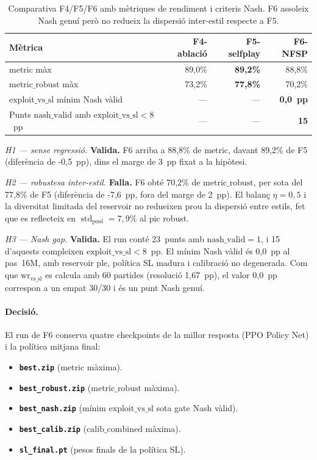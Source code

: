 \begin{table}[H]
  \centering
  \begin{tabular}{lrrr}
    \toprule
    Mètrica & F4-ablació & F5-selfplay & F6-NFSP \\
    \midrule
    \(\text{metric}\) màx & 89{,}0\% & \textbf{89{,}2\%} & 88{,}8\% \\
    \(\text{metric\_robust}\) màx & 73{,}2\% & \textbf{77{,}8\%} & 70{,}2\% \\
    \(\text{exploit\_vs\_sl}\) mínim Nash vàlid & — & — & \textbf{0{,}0~pp} \\
    Punts \(\text{nash\_valid}\) amb \(\text{exploit\_vs\_sl}<8\)~pp & — & — & \textbf{15} \\
    \bottomrule
  \end{tabular}
  \caption{Comparativa F4/F5/F6 amb mètriques de rendiment i criteris Nash.
           F6 assoleix Nash genuí però no redueix la dispersió inter-estil respecte a F5.}
  \label{tab:fase6}
\end{table}

\emph{H1 --- sense regressió.} \textbf{Valida.} F6 arriba a 88{,}8\% de
\(\text{metric}\), davant 89{,}2\% de F5 (diferència de -0{,}5~pp), dins el marge de
3~pp fixat a la hipòtesi.

\emph{H2 --- robustesa inter-estil.} \textbf{Falla.} F6 obté 70{,}2\% de
\(\text{metric\_robust}\), per sota del 77{,}8\% de F5 (diferència de -7{,}6~pp, fora del
marge de 2~pp). El balanç \(\eta=0{,}5\) i la diversitat limitada del reservoir no
redueixen prou la dispersió entre estils, fet que es reflecteix en
\(\operatorname{std}_{\text{pool}}=7{,}9\%\) al pic robust.

\emph{H3 --- Nash gap.} \textbf{Valida.} El run conté 23~punts amb
\(\text{nash\_valid}=1\), i 15 d'aquests compleixen \(\text{exploit\_vs\_sl}<8\)~pp.
El mínim Nash vàlid és 0{,}0~pp al pas~16M, amb reservoir ple, política \ac{SL} madura i
calibració no degenerada. Com que \(\text{wr}_{\text{vs\_sl}}\) es calcula amb 60
partides (resolució 1{,}67~pp), el valor 0{,}0~pp correspon a un empat 30/30 i és un
punt Nash genuí.

\paragraph{Decisió.} El run de F6 conserva quatre checkpoints de la millor resposta
(\ac{PPO} Policy Net) i la política mitjana final:

\begin{itemize}
  \item \textbf{\texttt{best.zip}} (\(\text{metric}\) màxima).
  \item \textbf{\texttt{best\_robust.zip}} (\(\text{metric\_robust}\) màxima).
  \item \textbf{\texttt{best\_nash.zip}} (mínim \(\text{exploit\_vs\_sl}\) sota gate Nash vàlid).
  \item \textbf{\texttt{best\_calib.zip}} (\(\text{calib\_combined}\) màxima).
  \item \textbf{\texttt{sl\_final.pt}} (pesos finals de la política \ac{SL}).
\end{itemize}

